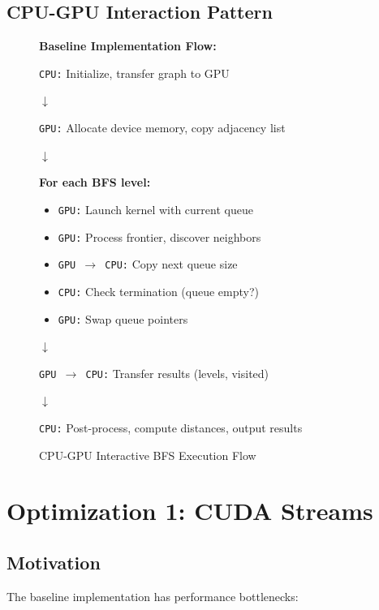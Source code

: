 \documentclass[11pt,a4paper]{article}
\begin{document}
\subsection{CPU-GPU Interaction Pattern}

\begin{figure}[H]
\centering
\begin{tcolorbox}[colback=blue!5!white,colframe=blue!75!black,width=0.9\textwidth]
\textbf{Baseline Implementation Flow:}

\texttt{CPU:} Initialize, transfer graph to GPU

$\downarrow$

\texttt{GPU:} Allocate device memory, copy adjacency list

$\downarrow$

\textbf{For each BFS level:}
\begin{itemize}
    \item \texttt{GPU:} Launch kernel with current queue
    \item \texttt{GPU:} Process frontier, discover neighbors
    \item \texttt{GPU $\rightarrow$ CPU:} Copy next queue size
    \item \texttt{CPU:} Check termination (queue empty?)
    \item \texttt{GPU:} Swap queue pointers
\end{itemize}

$\downarrow$

\texttt{GPU $\rightarrow$ CPU:} Transfer results (levels, visited)

$\downarrow$

\texttt{CPU:} Post-process, compute distances, output results
\end{tcolorbox}
\caption{CPU-GPU Interactive BFS Execution Flow}
\end{figure}

\section{Optimization 1: CUDA Streams}

\subsection{Motivation}

The baseline implementation has performance bottlenecks:
\end{document}
